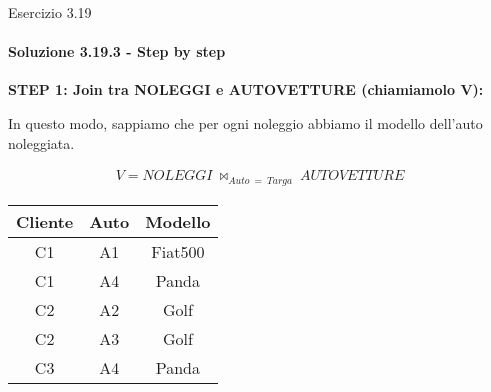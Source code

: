\begin{frame}{Esercizio 3.19}
    \framesubtitle{Soluzione 3.19.3 - Step by step}
    \vspace*{-1cm}

    {\small \textbf{STEP 1: Join tra NOLEGGI e AUTOVETTURE (chiamiamolo V):}}

    In questo modo, sappiamo che per ogni noleggio abbiamo il modello dell'auto noleggiata.

    \small
    \begin{gather*}
        V = NOLEGGI~\bowtie_{Auto~=~Targa}~AUTOVETTURE
    \end{gather*}
    
    \centering
    
    \begin{tabular}{|c|c|c|}
    \hline
    \rowcolor{cyan!30} Cliente  & Auto & Modello \\
    \hline
    C1 & A1 & Fiat500 \\
    \hline
    C1 & A4 & Panda \\
    \hline
    C2 & A2 & Golf \\
    \hline
    C2 & A3 & Golf \\
    \hline
    C3 & A4 & Panda \\
    \hline
    \end{tabular}
\end{frame}
%
